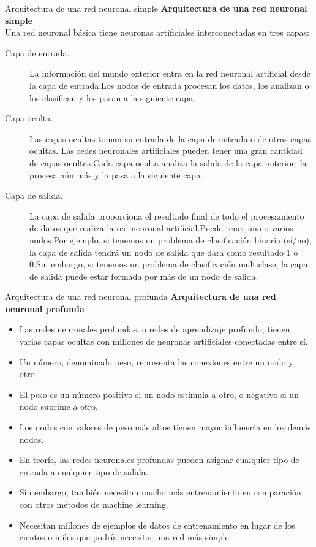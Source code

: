 \documentclass[11pt,aspectratio=169]{beamer}
\begin{document}
\begin{frame}{Arquitectura de una red neuronal simple}
	\textbf{Arquitectura de una red neuronal simple}\\
	Una red neuronal básica tiene neuronas artificiales interconectadas en tres capas:
	\begin{description}
		\item[Capa de entrada.] La información del mundo exterior entra en la red neuronal artificial desde la 
			capa de entrada.\pause Los nodos de entrada procesan los datos, los analizan o los clasifican y los pasan 
			a la siguiente capa.
		\item[Capa oculta. ] Las capas ocultas toman su entrada de la capa de entrada o de otras capas ocultas. \pause
			Las redes neuronales artificiales pueden tener una gran cantidad de capas ocultas.\pause Cada capa oculta 
			analiza la salida de la capa anterior, la procesa aún más y la pasa a la siguiente capa.\pause
		\item[Capa de salida. ] La capa de salida proporciona el resultado final de todo el procesamiento de datos 
			que realiza la red neuronal artificial.\pause Puede tener uno o varios nodos.\pause Por ejemplo, si tenemos 
			un problema de clasificación binaria (sí/no), la capa de salida tendrá un nodo de salida que dará como 
			resultado 1 o 0.\pause Sin embargo, si tenemos un problema de clasificación multiclase, la capa de salida 
			puede estar formada por más de un nodo de salida.
	\end{description}
\end{frame}

\begin{frame}{Arquitectura de una red neuronal profunda}
	\textbf{Arquitectura de una red neuronal profunda}
	\begin{itemize}
		\item Las redes neuronales profundas, o redes de aprendizaje profundo, tienen varias capas ocultas con millones 
			de neuronas artificiales conectadas entre sí.\pause
		\item Un número, denominado peso, representa las conexiones entre un nodo y otro.\pause 
		\item El peso es un número positivo si un nodo estimula a otro, o negativo si un nodo suprime a otro.\pause 
		\item Los nodos con valores de peso más altos tienen mayor influencia en los demás nodos.\pause
		\item En teoría, las redes neuronales profundas pueden asignar cualquier tipo de entrada a cualquier tipo de salida. \pause
		\item Sin embargo, también necesitan mucho más entrenamiento en comparación con otros métodos de machine learning. \pause
		\item Necesitan millones de ejemplos de datos de entrenamiento en lugar de los cientos o miles que podría necesitar una 
			red más simple.
	\end{itemize}
\end{frame}
\end{document}
